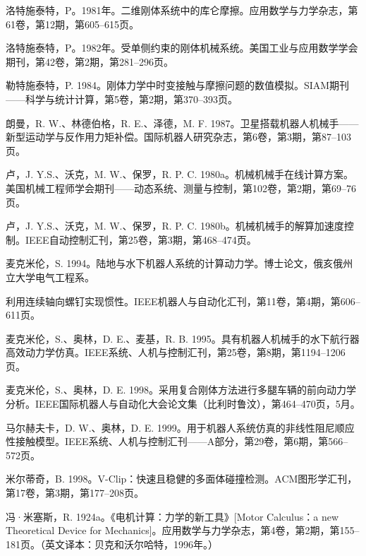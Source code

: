 \documentclass[10pt,a4paper]{book}
\theoremstyle{thmstyle} %
\theoremstyle{defstyle} %
\theoremstyle{prostyle} %
\begin{document}
洛特施泰特，P。1981年。二维刚体系统中的库仑摩擦。应用数学与力学杂志，第61卷，第12期，第605–615页。



洛特施泰特，P。1982年。受单侧约束的刚体机械系统。美国工业与应用数学学会期刊，第42卷，第2期，第281–296页。



勒特施泰特，P. 1984。刚体力学中时变接触与摩擦问题的数值模拟。SIAM期刊——科学与统计计算，第5卷，第2期，第370–393页。



朗曼，R. W.、林德伯格，R. E.、泽德，M. F. 1987。卫星搭载机器人机械手——新型运动学与反作用力矩补偿。国际机器人研究杂志，第6卷，第3期，第87–103页。



卢，J. Y.S.、沃克，M. W.、保罗，R. P. C. 1980a。机械机械手在线计算方案。美国机械工程师学会期刊——动态系统、测量与控制，第102卷，第2期，第69–76页。



卢，J. Y.S.、沃克，M. W.、保罗，R. P. C. 1980b。机械机械手的解算加速度控制。IEEE自动控制汇刊，第25卷，第3期，第468–474页。



麦克米伦，S. 1994。陆地与水下机器人系统的计算动力学。博士论文，俄亥俄州立大学电气工程系。



利用连续轴向螺钉实现惯性。IEEE机器人与自动化汇刊，第11卷，第4期，第606–611页。



麦克米伦，S.、奥林，D. E.、麦基，R. B. 1995。具有机器人机械手的水下航行器高效动力学仿真。IEEE系统、人机与控制汇刊，第25卷，第8期，第1194–1206页。



麦克米伦，S.、奥林，D. E. 1998。采用复合刚体方法进行多腿车辆的前向动力学分析。IEEE国际机器人与自动化大会论文集（比利时鲁汶），第464–470页，5月。



马尔赫夫卡，D. W.、奥林，D. E. 1999。用于机器人系统仿真的非线性阻尼顺应性接触模型。IEEE系统、人机与控制汇刊——A部分，第29卷，第6期，第566–572页。



米尔蒂奇，B. 1998。V-Clip：快速且稳健的多面体碰撞检测。ACM图形学汇刊，第17卷，第3期，第177–208页。



冯·米塞斯，R. 1924a。《电机计算：力学的新工具》[Motor Calculus：a new Theoretical Device for Mechanics]。应用数学与力学杂志，第4卷，第2期，第155–181页。（英文译本：贝克和沃尔哈特，1996年。）
\end{document}

